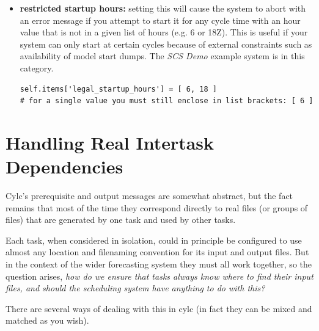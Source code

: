 \documentclass[11pt,a4paper]{article}
\begin{document}
\begin{itemize}
    \item {\bf restricted startup hours:} setting this will cause 
        the system to abort with an error message if you attempt to
        start it for any cycle time with an hour value that is not in a given
        list of hours (e.g. 6 or 18Z). This is useful if your system 
        can only start at certain cycles because of external constraints
        such as availability of model start dumps. The {\em SCS Demo}
        example system is in this category.

    \begin{lstlisting}
self.items['legal_startup_hours'] = [ 6, 18 ]
# for a single value you must still enclose in list brackets: [ 6 ] 
    \end{lstlisting}

\end{itemize}


\pagebreak

%
%
%

\lstset{language=}


\section{Handling Real Intertask Dependencies}
\label{HandlingRealIntertaskDependencies}

Cylc's prerequisite and output messages are somewhat abstract, but the
fact remains that most of the time they correspond directly to real 
files (or groups of files) that are generated by one task and used by
other tasks.

Each task, when considered in isolation, could in principle be
configured to use almost any location and filenaming convention for its
input and output files. But in the context of the wider forecasting
system they must all work together, so the question arises, {\em how do
we ensure that tasks always know where to find their input files, and
should the scheduling system have anything to do with this?} 

There are several ways of dealing with this in cylc (in fact they can
be mixed and matched as you wish). 
\end{document}
